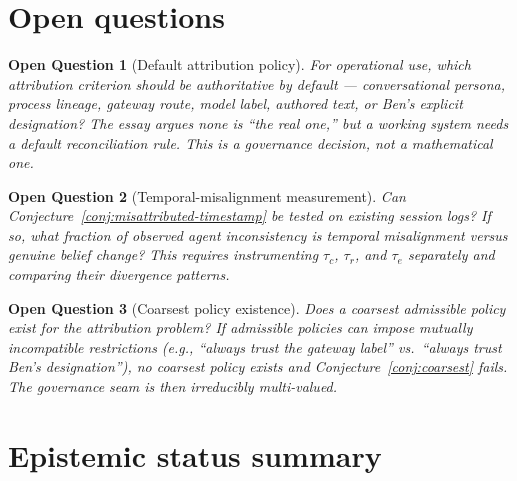 \documentclass[11pt]{article}
\newtheorem{openquestion}{Open Question}
\newcommand{\tauc}{\tau_c}
\newcommand{\taur}{\tau_r}
\newcommand{\taue}{\tau_e}
\begin{document}
\section{Open questions}

\begin{openquestion}[Default attribution policy]
\label{oq:default-attribution}
For operational use, which attribution criterion should be authoritative by default ---
conversational persona, process lineage, gateway route, model label, authored text, or
Ben's explicit designation? The essay argues none is ``the real one,'' but a working system
needs a default reconciliation rule. This is a governance decision, not a mathematical one.
\end{openquestion}

\begin{openquestion}[Temporal-misalignment measurement]
\label{oq:temporal-misalignment}
Can Conjecture~\ref{conj:misattributed-timestamp} be tested on existing session logs?
If so, what fraction of observed agent inconsistency is temporal misalignment versus
genuine belief change? This requires instrumenting $\tauc$, $\taur$, and $\taue$
separately and comparing their divergence patterns.
\end{openquestion}

\begin{openquestion}[Coarsest policy existence]
\label{oq:coarsest}
Does a coarsest admissible policy exist for the attribution problem? If admissible policies
can impose mutually incompatible restrictions (e.g., ``always trust the gateway label''
vs.\ ``always trust Ben's designation''), no coarsest policy exists and
Conjecture~\ref{conj:coarsest} fails. The governance seam is then irreducibly multi-valued.
\end{openquestion}

\section{Epistemic status summary}
\end{document}
